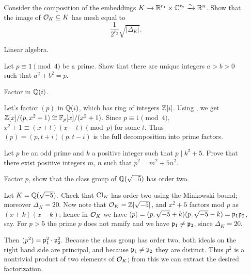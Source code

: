 \begin{problem} 
	\label{prob:OK_linalg}
	Consider the composition of the embeddings $K \hookrightarrow \mathbb R^{r_1} \times \mathbb C^{r_2} \xrightarrow{\sim} \mathbb R^n$.
	Show that the image of $\mathcal O_K \subseteq K$ has mesh equal to
	\[ \frac{1}{2^{r_2}} \sqrt{\left\lvert \Delta_K \right\rvert}. \]
	\begin{hint}
		Linear algebra.
	\end{hint}
\end{problem}

\begin{problem}
	Let $p \equiv 1 \pmod 4$ be a prime.
	Show that there are unique integers $a > b > 0$ such that $a^2+b^2=p$.
	\begin{hint}
		Factor in $\mathbb Q(i)$.
	\end{hint}
	\begin{sol}
		Let's factor $(p)$ in $\mathbb Q(i)$, which has ring of integers $\mathbb Z[i]$.
		Using , we get $\mathbb Z[x] / (p,x^2+1) \cong \mathbb F_p[x] / (x^2+1)$.
		Since $p \equiv 1 \pmod 4$, $x^2+1 \equiv (x+t)(x-t) \pmod p$ for some $t$.
		Thus $(p) = (p, t+i)(p, t-i)$ is the full decomposition into prime factors.
	\end{sol}
\end{problem}


\begin{problem}
	[Korea 2014]
	Let $p$ be an odd prime and $k$ a positive integer such that $p \mid k^2+5$.
	Prove that there exist positive integers $m$, $n$ such that $p^2 = m^2+5n^2$.
	\begin{hint}
		Factor $p$, show that the class group of $\mathbb Q(\sqrt{-5})$ has order two.
	\end{hint}
	\begin{sol}
		Let $K = \mathbb Q(\sqrt{-5})$. Check that $\mathrm{Cl}_K$ has order two using the Minkowski bound;
		moreover $\Delta_K = 20$.
		Now note that $\mathcal O_K = \mathbb Z[\sqrt{-5}]$, and $x^2+5$ factors mod $p$ as $(x+k)(x-k)$;
		hence in $\mathcal O_K$ we have $(p) = (p, \sqrt{-5}+k)(p, \sqrt{-5}-k) = \mathfrak p_1 \mathfrak p_2$, say.
		For $p > 5$ the prime $p$ does not ramify and we have $\mathfrak p_1 \neq \mathfrak p_2$, since $\Delta_K = 20$.

		Then $(p^2) = \mathfrak p_1^2 \cdot \mathfrak p_2^2$. Because the class group has order two,
		both ideals on the right hand side are principal, and because $\mathfrak p_1 \neq \mathfrak p_2$ they are distinct.
		Thus $p^2$ is a nontrivial product of two elements of $\mathcal O_K$; from this we can extract the desired factorization.
	\end{sol}
\end{problem}
